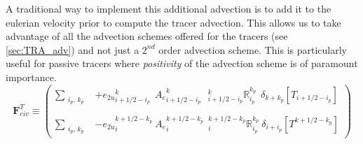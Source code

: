 \documentclass[../main/NEMO_manual]{subfiles}
\begin{document}
A traditional way to implement this additional advection is to add it to the eulerian velocity prior to
compute the tracer advection.
This allows us to take advantage of all the advection schemes offered for the tracers
(see \autoref{sec:TRA_adv}) and not just a $2^{nd}$ order advection scheme.
This is particularly useful for passive tracers where
\emph{positivity} of the advection scheme is of paramount importance. 
\[
  \textbf{F}_{eiv}^T   \equiv   \left(
    \begin{aligned}
      \sum_{\substack{i_p,\,k_p}} &
      +{e_{2u}}_{i+1/2-i_p}^{k}                                  \ \ {A_{e}}_{i+1/2-i_p}^{k}
      \ \ \ { _{i+1/2-i_p}^k \mathbb{R}_{i_p}^{k_p} }    \ \ \delta_{k+k_p}[T_{i+1/2-i_p}] \\ \\
      \sum_{\substack{i_p,\,k_p}} &
      - {e_{2u}}_i^{k+1/2-k_p}                                      \ {A_{e}}_i^{k+1/2-k_p}
      \ \ { _i^{k+1/2-k_p} \mathbb{R}_{i_p}^{k_p} }    \ \delta_{i+i_p}[T^{k+1/2-k_p}]
    \end{aligned}
  \right)
\]
\end{document}
